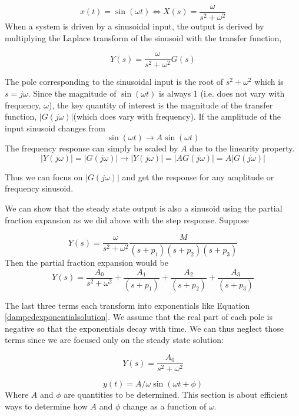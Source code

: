 \[
x(t) = \sin(\omega t)   \Leftrightarrow X(s) = \frac{\omega}{s^2 + \omega^2}
\]
When a system is driven by a sinusoidal input, the output is derived by multiplying the Laplace transform of the sinusoid with the transfer function,

\[
Y(s) =  \frac{\omega}{s^2 + \omega^2} G(s)
\]

The pole corresponding to the sinusoidal input is the root of $s^2+\omega^2$ which is $s=j\omega$.  Since the magnitude of $\sin(\omega t)$ is always 1 (i.e. does not vary with frequency, $\omega$), the key quantity of interest  is the magnitude of the  transfer function, $|G(j\omega)|$(which does vary with frequency).  If the amplitude of the input sinusoid changes from
\[
\sin(\omega t) \to A\sin(\omega t)
\]
The frequency response can simply be scaled by $A$ due to the linearity property.
\[
|Y(j\omega)| = |G(j\omega)| \to |Y(j\omega)| =|AG(j\omega)|=A|G(j\omega)|
\]

Thus we can focus on $|G(j\omega)|$ and get the response for any amplitude or frequency sinusoid.

We can show that the steady state output is also a sinusoid using the partial fraction expansion as we did above with the step response.   Suppose

\[
Y(s) = \frac{\omega}{s^2 + \omega^2} \frac  {M}   {(s+p_1)(s+p_2)(s+p_3)}
\]
Then the partial fraction expansion would be
\[
Y(s) =  \frac{A_0} {s^2+\omega^2} +  \frac{A_1} {(s+p_1)} +  \frac{A_2} {(s+p_2)} +  \frac{A_3} {(s+p_3)}
\]

The last three terms each transform into exponentials like Equation \ref{dampedexponentialsolution}.
We assume that the real part of each pole is negative so that the exponentials decay with time.   We can thus neglect those terms since we are focused only on the steady state solution:


\[
Y(s) =  \frac{A_0} {s^2+\omega^2}
\]

\[
y(t) = A/\omega \sin(\omega t + \phi)
\]
Where $A$ and $\phi$ are quantities to be determined.   This section is about efficient ways to determine how $A$ and $\phi$ change as a function of $\omega$.



